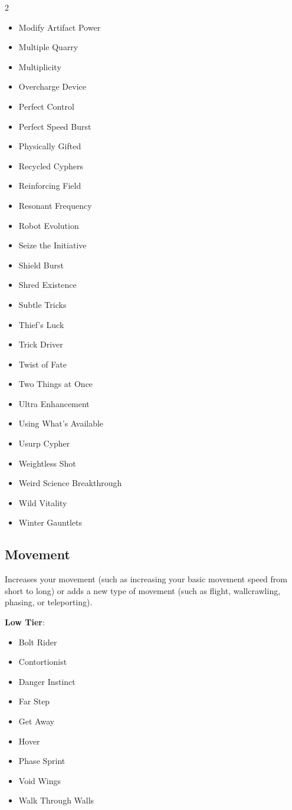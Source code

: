 \begin{multicols}{2}
\begin{itemize}
\item Modify Artifact Power
\item Multiple Quarry
\item Multiplicity
\item Overcharge Device
\item Perfect Control
\item Perfect Speed Burst
\item Physically Gifted
\item Recycled Cyphers
\item Reinforcing Field  
\item Resonant Frequency
\item Robot Evolution
\item Seize the Initiative
\item Shield Burst
\item Shred Existence
\item Subtle Tricks
\item Thief’s Luck
\item Trick Driver
\item Twist of Fate
\item Two Things at Once
\item Ultra Enhancement
\item Using What’s Available
\item Usurp Cypher
\item Weightless Shot
\item Weird Science Breakthrough
\item Wild Vitality
\item Winter Gauntlets
\end{itemize}

\subsection{Movement}

Increases your movement (such as increasing your basic movement speed from short to long) or adds a new type of movement (such as flight, wallcrawling, phasing, or teleporting).

\textbf{Low Tier}:

\begin{itemize}
\item Bolt Rider
\item Contortionist
\item Danger Instinct
\item Far Step
\item Get Away
\item Hover
\item Phase Sprint
\item Void Wings
\item Walk Through Walls
\end{itemize}


\end{multicols}
